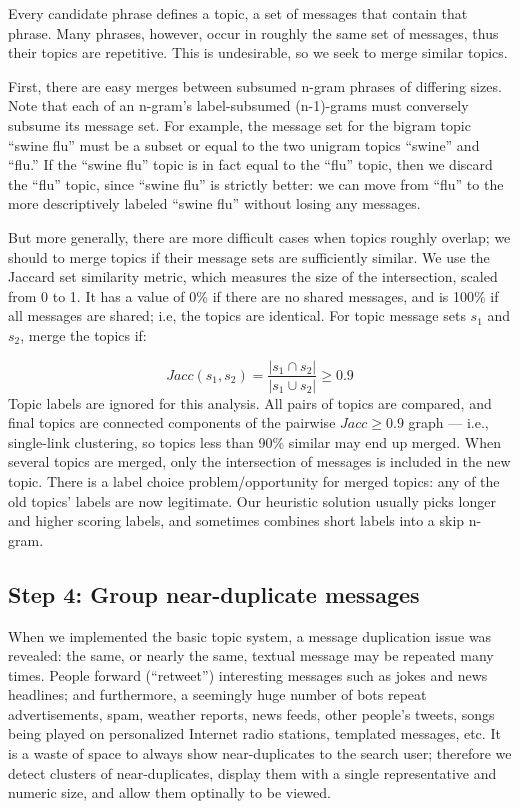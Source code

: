 \documentclass[letterpaper]{article}
\newcommand{\bto}[1]{\textcolor{blue}{\textbf{[#1 --BTO]}}}
\newcommand{\codenote}[1]{}
\begin{document}
\codenote{ deduper.py }
Every candidate phrase defines a topic, a set of messages that contain that phrase.  Many phrases, however, occur in roughly the same set of messages, thus their topics are repetitive.  This is undesirable, so we seek to merge similar topics.

First, there are easy merges between subsumed n-gram phrases of differing sizes.  Note that each of an n-gram's label-subsumed (n-1)-grams must conversely subsume its message set.  For example, the message set for the bigram topic ``swine flu'' must be a subset or equal to the two unigram topics ``swine'' and ``flu.''  If the ``swine flu'' topic is in fact equal to the ``flu'' topic, then we discard the ``flu'' topic, since ``swine flu'' is strictly better: we can move from ``flu'' to the more descriptively labeled ``swine flu'' without losing any messages.


But more generally, there are more difficult cases when topics roughly overlap; we should to merge topics if their message sets are sufficiently similar.  We use the Jaccard set similarity metric, which measures the size of the intersection, scaled from 0 to 1.  It has a value of 0\% if there are no shared messages, and is 100\% if all messages are shared; i.e, the topics are identical.  For topic message sets $s_1$ and $s_2$, merge the topics if:

\[ Jacc(s_1,s_2) = \frac{ |s_1 \cap s_2| }{ |s_1 \cup s_2 | } \geq 0.9 
\]
Topic labels are ignored for this analysis.  All pairs of topics are compared, and final topics are connected components of the pairwise $Jacc \geq 0.9$ graph --- i.e., single-link clustering, so topics less than 90\% similar may end up merged.  When several topics are merged, only the intersection of messages is included in the new topic.  There is a label choice problem/opportunity for merged topics: any of the old topics' labels are now legitimate.  Our heuristic solution usually picks longer and higher scoring labels, and sometimes combines short labels into a skip n-gram.

\subsection{Step 4: Group near-duplicate messages}

\codenote{ deduper.py }
When we implemented the basic topic system, a message duplication issue was revealed: the same, or nearly the same, textual message may be repeated many times.  People forward (``retweet'') interesting messages such as jokes and news headlines; 
and furthermore, a seemingly huge number of bots repeat advertisements, spam, weather reports, news feeds, other people's tweets, songs being played on personalized Internet radio stations, templated messages, etc.  It is a waste of space to always show near-duplicates to the search user; therefore we detect clusters of near-duplicates, display them with a single representative and numeric size, and allow them optinally to be viewed.%
\end{document}

